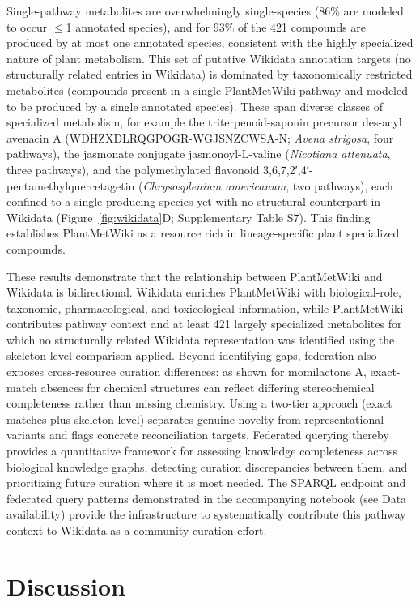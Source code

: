 \documentclass[11pt,a4paper]{article}
\begin{document}
Single-pathway metabolites are overwhelmingly single-species (86\% are modeled to occur $\leq$1 annotated
species), and for 93\% of the 421 compounds are produced by at most one annotated species,
consistent with the highly specialized nature of plant metabolism. This set of putative Wikidata
annotation targets (no structurally related entries in Wikidata) is dominated by taxonomically restricted metabolites
(compounds present in a single PlantMetWiki pathway and modeled to be produced by a single annotated species). These
span diverse classes of specialized metabolism, for example the triterpenoid-saponin precursor des-acyl avenacin A
(WDHZXDLRQGPOGR-WGJSNZCWSA-N; \textit{Avena strigosa}, four pathways), the jasmonate conjugate
jasmonoyl-L-valine (\textit{Nicotiana attenuata}, three pathways), and the polymethylated flavonoid
3,6,7,2′,4′-pentamethylquercetagetin (\textit{Chrysosplenium americanum}, two pathways), each confined
to a single producing species yet with no structural counterpart in Wikidata
(Figure~\ref{fig:wikidata}D; Supplementary Table S7). This finding establishes PlantMetWiki as a
resource rich in lineage-specific plant specialized compounds.

These results demonstrate that the relationship between PlantMetWiki and Wikidata is bidirectional.
Wikidata enriches PlantMetWiki with biological-role, taxonomic, pharmacological, and toxicological
information, while PlantMetWiki contributes pathway context and at least 421 largely specialized
metabolites for which no structurally related Wikidata representation was identified using
the skeleton-level comparison applied. Beyond
identifying gaps, federation also exposes cross-resource curation differences: as shown for momilactone
A, exact-match absences for chemical structures can reflect differing stereochemical completeness rather than missing
chemistry. Using a two-tier approach (exact matches plus skeleton-level) separates genuine novelty from
representational variants and flags concrete reconciliation targets. Federated querying thereby
provides a quantitative framework for assessing knowledge completeness across biological knowledge
graphs, detecting curation discrepancies between them, and prioritizing future curation where
it is most needed. The SPARQL endpoint and federated query patterns demonstrated in the accompanying
notebook (see Data availability) provide the infrastructure to systematically contribute this pathway
context to Wikidata as a community curation effort.

\section*{Discussion}
\end{document}
